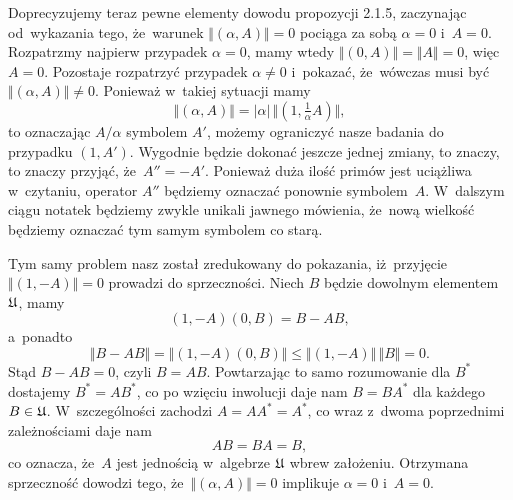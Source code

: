 \documentclass[a4paper,11pt]{article}
\begin{document}
Doprecyzujemy teraz pewne elementy dowodu propozycji 2.1.5, zaczynając
od~wykazania tego, że~warunek $\Vert ( \alpha, A ) \Vert = 0$ pociąga za sobą $\alpha = 0$
i~$A = 0$. Rozpatrzmy najpierw przypadek $\alpha = 0$, mamy wtedy
$\Vert ( 0, A ) \Vert = \Vert A \Vert = 0$, więc $A = 0$. Pozostaje rozpatrzyć przypadek
$\alpha \neq 0$ i~pokazać, że~wówczas musi być $\Vert ( \alpha, A ) \Vert \neq 0$. Ponieważ w~takiej
sytuacji mamy
\begin{equation}
  \label{eq:Bratteli-Robinson-Operator-Algebras-ETC-Vol-I-s01-10}
  \Vert ( \alpha, A ) \Vert = | \alpha | \, \Vert ( 1, \tfrac{ 1 }{ \alpha } A ) \Vert,
\end{equation}
to oznaczając $A / \alpha$ symbolem $A'$, możemy ograniczyć nasze badania
do przypadku $( 1, A' )$. Wygodnie będzie dokonać jeszcze jednej zmiany, to
znaczy, to znaczy przyjąć, że~$A'' = -A'$. Ponieważ duża ilość primów jest
uciążliwa w~czytaniu, operator $A''$ będziemy oznaczać ponownie
symbolem~$A$. W~dalszym ciągu notatek będziemy zwykle unikali jawnego
mówienia, że~nową wielkość będziemy oznaczać tym samym symbolem co starą.

Tym samy problem nasz został zredukowany do pokazania, iż~przyjęcie
$\Vert ( 1, -A ) \Vert = 0$ prowadzi do sprzeczności. Niech $B$ będzie dowolnym
elementem $\mathfrak{U}$, mamy
\begin{equation}
  \label{eq:Bratteli-Robinson-Operator-Algebras-ETC-Vol-I-s01-11}
  ( 1, -A ) ( 0, B ) = B - AB,
\end{equation}
a~ponadto
\begin{equation}
  \label{eq:Bratteli-Robinson-Operator-Algebras-ETC-Vol-I-s01-12}
  \Vert B - A B \Vert =
  \Vert ( 1, -A ) ( 0, B ) \Vert \leq
  \Vert ( 1, -A ) \Vert \, \Vert B \Vert = 0.
\end{equation}
Stąd $B - A B = 0$, czyli $B = A B$. Powtarzając to samo rozumowanie dla
$B^{ * }$ dostajemy $B^{ * } = A B^{ * }$, co po wzięciu inwolucji daje nam
$B = B A^{ * }$ dla każdego $B \in \mathfrak{U}$. W~szczególności zachodzi
$A = A A^{ * } = A^{ * }$, co wraz z~dwoma poprzednimi zależnościami daje nam
\begin{equation}
  \label{eq:Bratteli-Robinson-Operator-Algebras-ETC-Vol-I-s01-13}
  A B = B A = B,
\end{equation}
co oznacza, że~$A$ jest jednością w~algebrze $\mathfrak{U}$ wbrew założeniu.
Otrzymana sprzeczność dowodzi tego, że~$\Vert ( \alpha, A ) \Vert = 0$ implikuje
$\alpha = 0$ i~$A = 0$.

\vspace{\VerSpaceFour}
\end{document}
